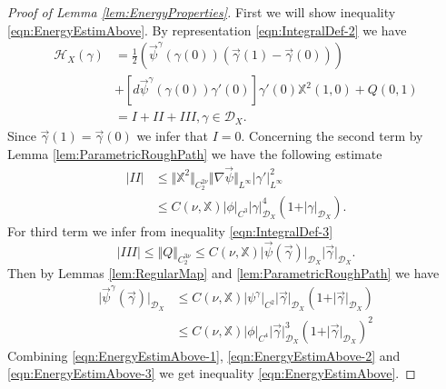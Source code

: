 \documentclass[11pt,a4paper,leqno]{amsart}%
\theoremstyle{plain}
\theoremstyle{remark}
\theoremstyle{plain}
\numberwithin{equation}{section}
\begin{document}
\begin{proof}[ Proof of Lemma \ref{lem:EnergyProperties}]
First we will show inequality \eqref{eqn:EnergyEstimAbove}. By
representation \eqref{eqn:IntegralDef-2} we have
\begin{align}
\mathcal{H}_X(\gamma)&=\frac{1}{2}(\vec{\psi}^{\gamma}(\gamma(0))(\vec{\gamma}(1)-\vec{\gamma}(0)))\nonumber\\
&+\left[d\vec{\psi}^{\gamma}(\gamma(0))\gamma'(0)\right]\gamma'(0)\mathbb{X}^2(1,0)+Q(0,1)\nonumber\\
&=I+II+III,\gamma\in\mathcal{D}_X.\nonumber
\end{align}
Since $\vec{\gamma}(1)=\vec{\gamma}(0)$ we infer that $I=0$.
Concerning the second term by Lemma \ref{lem:ParametricRoughPath}
we have the following estimate
\begin{align}
\vert II\vert &\leq
\Vert \mathbb{X}^2\Vert_{C_2^{2\nu}}\Vert \nabla\vec{\psi}\Vert_{L^{\infty}}\vert \gamma'\vert_{L^{\infty}}^2\nonumber\\
&\leq
C(\nu,\mathbb{X})\vert \phi\vert_{C^3}\vert \gamma\vert_{\mathcal{D}_X}^4(1+\vert \gamma\vert_{\mathcal{D}_X}).\label{eqn:EnergyEstimAbove-1}
\end{align}
For third term we infer from inequality \eqref{eqn:IntegralDef-3}
\begin{equation}
\vert III\vert \leq \Vert Q\Vert_{C_2^{3\nu}}\leq
C(\nu,\mathbb{X})\vert \vec{\psi}(\vec{\gamma})\vert_{\mathcal{D}_X}\vert \vec{\gamma}\vert_{\mathcal{D}_X}.\label{eqn:EnergyEstimAbove-2}
\end{equation}
Then by Lemmas \ref{lem:RegularMap} and
\ref{lem:ParametricRoughPath} we have
\begin{align}
\vert \vec{\psi}^{\gamma}(\vec{\gamma})\vert_{\mathcal{D}_X}&\leq
C(\nu,\mathbb{X})\vert \psi^{\gamma}\vert_{C^2}\vert \vec{\gamma}\vert_{\mathcal{D}_X}(1+\vert \vec{\gamma}\vert_{\mathcal{D}_X})\nonumber\\
&\leq C(\nu,\mathbb{X})\vert \phi\vert_{C^4}\vert \vec{\gamma}\vert_{\mathcal{D}_X}^3(1+\vert \vec{\gamma}\vert_{\mathcal{D}_X})^2\label{eqn:EnergyEstimAbove-3}
\end{align}
Combining \eqref{eqn:EnergyEstimAbove-1},
\eqref{eqn:EnergyEstimAbove-2} and \eqref{eqn:EnergyEstimAbove-3}
we get inequality \eqref{eqn:EnergyEstimAbove}.


\end{proof}
\end{document}

